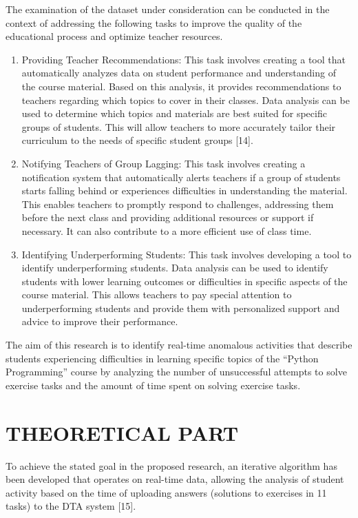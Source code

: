 \documentclass[letterpaper]{article}
\begin{document}
\begin{multicols}{2}
\begin{justify}
      The examination of the dataset under consideration can be conducted in the context of addressing the following tasks to improve the quality of the educational process and optimize teacher resources.

      \begin{enumerate}
        \item	Providing Teacher Recommendations: This task involves creating a tool that automatically analyzes data on student performance and understanding of the course material. Based on this analysis, it provides recommendations to teachers regarding which topics to cover in their classes. Data analysis can be used to determine which topics and materials are best suited for specific groups of students. This will allow teachers to more accurately tailor their curriculum to the needs of specific student groups [14].
        \item	Notifying Teachers of Group Lagging: This task involves creating a notification system that automatically alerts teachers if a group of students starts falling behind or experiences difficulties in understanding the material. This enables teachers to promptly respond to challenges, addressing them before the next class and providing additional resources or support if necessary. It can also contribute to a more efficient use of class time.
        \item	Identifying Underperforming Students: This task involves developing a tool to identify underperforming students. Data analysis can be used to identify students with lower learning outcomes or difficulties in specific aspects of the course material. This allows teachers to pay special attention to underperforming students and provide them with personalized support and advice to improve their performance.
      \end{enumerate}
      The aim of this research is to identify real-time anomalous activities that describe students experiencing difficulties in learning specific topics of the “Python Programming” course by analyzing the number of unsuccessful attempts to solve exercise tasks and the amount of time spent on solving exercise tasks.
      \section{THEORETICAL PART}
      To achieve the stated goal in the proposed research, an iterative algorithm has been developed that operates on real-time data, allowing the analysis of student activity based on the time of uploading answers (solutions to exercises in 11 tasks) to the DTA system [15].


\end{justify}
\end{multicols}
\end{document}
